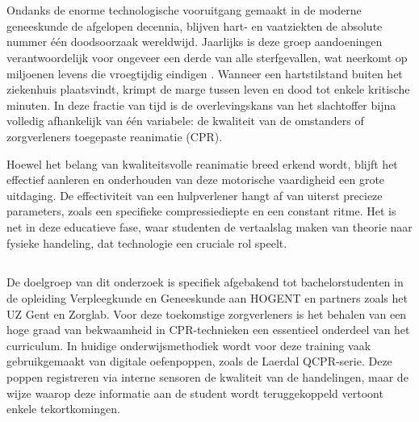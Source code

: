 
\chapter{}%
\label{ch:inleiding}

\section{}%
\label{sec:context_en_urgentie}

Ondanks de enorme technologische vooruitgang gemaakt in de moderne geneeskunde de afgelopen decennia, blijven hart- en 
vaatziekten de absolute nummer één doodsoorzaak wereldwijd. Jaarlijks is deze groep aandoeningen verantwoordelijk voor ongeveer 
een derde van alle sterfgevallen, wat neerkomt op miljoenen levens die vroegtijdig eindigen \autocite{owid-causes-of-death}. 
Wanneer een hartstilstand buiten het ziekenhuis plaatsvindt, krimpt de marge tussen leven en dood tot enkele kritische minuten. 
In deze fractie van tijd is de overlevingskans van het slachtoffer bijna volledig afhankelijk van één variabele: de kwaliteit van de 
omstanders of zorgverleners toegepaste reanimatie (CPR).

Hoewel het belang van kwaliteitsvolle reanimatie breed erkend wordt, blijft het effectief aanleren en onderhouden van deze motorische 
vaardigheid een grote uitdaging. De effectiviteit van een hulpverlener hangt af van uiterst precieze parameters, zoals een specifieke 
compressiediepte en een constant ritme. Het is net in deze educatieve fase, waar studenten de vertaalslag maken van theorie naar fysieke 
handeling, dat technologie een cruciale rol speelt.

\section{}%
\label{sec:probleemstelling}

De doelgroep van dit onderzoek is specifiek afgebakend tot bachelorstudenten in de opleiding Verpleegkunde en Geneeskunde aan 
HOGENT en partners zoals het UZ Gent en Zorglab. Voor deze toekomstige zorgverleners is het behalen van een hoge graad van bekwaamheid 
in CPR-technieken een essentieel onderdeel van het curriculum. In huidige onderwijsmethodiek wordt voor deze training vaak gebruikgemaakt
 van digitale oefenpoppen, zoals de Laerdal QCPR-serie. Deze poppen registreren via interne sensoren de kwaliteit van de handelingen, 
 maar de wijze waarop deze informatie aan de student wordt teruggekoppeld vertoont enkele tekortkomingen.


